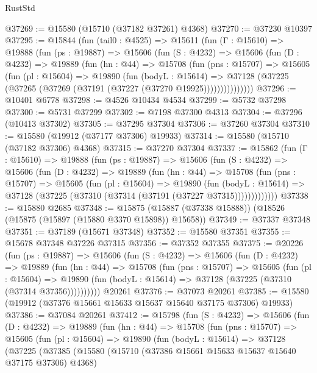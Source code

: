 \begin{lexlean}{RustStd}
\begin{coremodule}
@37269 := @15580 (@15710 (@37182 @37261) @4368)
@37270 := @37230 @10397
@37295 := @15844
    (fun (tail0 : @4525) =>
    @15611
      (fun (Γ : @15610) =>
      @19888
        (fun (ps : @19887) =>
        @15606
          (fun (S : @4232) =>
          @15606
            (fun (D : @4232) =>
            @19889
              (fun (hn : @44) =>
              @15708
                (fun (pns : @15707) =>
                @15605
                  (fun (pl : @15604) =>
                  @19890
                    (fun (bodyL : @15614) =>
                    @37128 (@37225 (@37265 (@37269 (@37191 (@37227 (@37270 @19925)))))))))))))))
@37296 := @10401 @6778
@37298 := @4526 @10434 @4534
@37299 := @5732 @37298
@37300 := @5731 @37299
@37302 := @7198 @37300 @4313
@37304 := @37296 (@10413 @37302)
@37305 := @37295 @37304
@37306 := @37260 @37304
@37310 := @15580 (@19912 (@37177 @37306) @19933)
@37314 := @15580 (@15710 (@37182 @37306) @4368)
@37315 := @37270 @37304
@37337 := @15862
    (fun (Γ : @15610) =>
    @19888
      (fun (ps : @19887) =>
      @15606
        (fun (S : @4232) =>
        @15606
          (fun (D : @4232) =>
          @19889
            (fun (hn : @44) =>
            @15708
              (fun (pns : @15707) =>
              @15605
                (fun (pl : @15604) =>
                @19890
                  (fun (bodyL : @15614) =>
                  @37128 (@37225 (@37310 (@37314 (@37191 (@37227 @37315)))))))))))))
@37338 := @15880 @2685
@37348 := @15875 (@15887 (@37338 @15888)) (@18526 (@15875 (@15897 (@15880 @3370 @15898)) @15658))
@37349 := @37337 @37348
@37351 := @37189 (@15671 @37348)
@37352 := @15580 @37351
@37355 := @15678 @37348 @37226 @37315
@37356 := @37352 @37355
@37375 := @20226
    (fun (ps : @19887) =>
    @15606
      (fun (S : @4232) =>
      @15606
        (fun (D : @4232) =>
        @19889
          (fun (hn : @44) =>
          @15708
            (fun (pns : @15707) =>
            @15605
              (fun (pl : @15604) =>
              @19890 (fun (bodyL : @15614) => @37128 (@37225 (@37310 (@37314 @37356))))))))))
    @20261
@37376 := @37073 @20261
@37385 := @15580 (@19912 (@37376 @15661 @15633 @15637 @15640 @37175 @37306) @19933)
@37386 := @37084 @20261
@37412 := @15798
    (fun (S : @4232) =>
    @15606
      (fun (D : @4232) =>
      @19889
        (fun (hn : @44) =>
        @15708
          (fun (pns : @15707) =>
          @15605
            (fun (pl : @15604) =>
            @19890
              (fun (bodyL : @15614) =>
              @37128
                (@37225
                  (@37385
                    (@15580
                      (@15710 (@37386 @15661 @15633 @15637 @15640 @37175 @37306) @4368)

\end{coremodule}
\end{lexlean}
